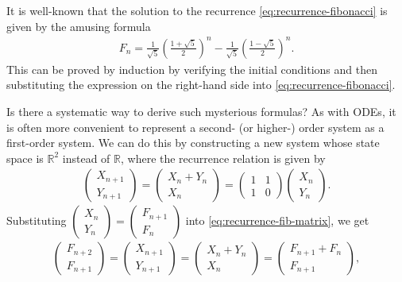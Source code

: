 \documentclass[12pt]{amsart}
\newcommand{\eq}[1]{\begin{equation}\begin{split}#1\end{split}\end{equation}}
\newcommand{\eqst}[1]{\begin{align*}#1\end{align*}}
\begin{document}
It is well-known that the solution to the recurrence \eqref{eq:recurrence-fibonacci} is given by the amusing formula
\eq{ \label{eq:fibonacci-closedform}
F_n = \frac{1}{\sqrt{5}}\left(\frac{1+\sqrt{5}}{2}\right)^n-\frac{1}{\sqrt{5}}\left(\frac{1-\sqrt{5}}{2}\right)^n.
}
This can be proved by induction by verifying the initial conditions and then substituting the expression on the right-hand side into \eqref{eq:recurrence-fibonacci}.

Is there a systematic way to derive such mysterious formulas? As with ODEs, it is often more convenient to represent a second- (or higher-) order system as a first-order system. We can do this by constructing a new system whose state space is $\mathbb{R}^2$ instead of $\mathbb{R}$, where the recurrence relation is given by
\eq{ \label{eq:recurrence-fib-matrix}
\left( \begin{array}{c}X_{n+1}\\Y_{n+1}\end{array}\right) = 
\left( \begin{array}{c} X_n+Y_n \\ X_n
\end{array}\right) = 
\left( \begin{array}{cc}
1&1\\1&0
\end{array}\right) 
\left( \begin{array}{c}X_n\\Y_n\end{array}\right). 
}
Substituting $\left( \begin{array}{c}X_n\\Y_n\end{array}\right)=\left( \begin{array}{c}F_{n+1}\\F_n\end{array}\right)$ into \eqref{eq:recurrence-fib-matrix}, we get
\eqst{
\left( \begin{array}{c}F_{n+2}\\F_{n+1}\end{array}\right)
=
\left( \begin{array}{c} X_{n+1}\\ Y_{n+1}
\end{array}\right) = 
\left( \begin{array}{c} X_n+Y_n \\ X_n
\end{array}\right) =
\left( \begin{array}{c} F_{n+1}+F_n \\ F_{n+1}
\end{array}\right),
}
\end{document}
